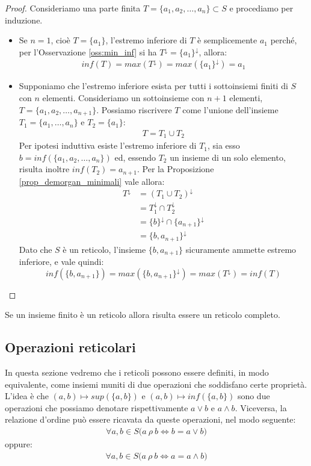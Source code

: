 \begin{proof}
	Consideriamo una parte finita $T =\{a_{1},a_{2},\ldots,a_{n}\} \subset S$ e procediamo per induzione.
	\begin{itemize}
		\item Se $n=1$, cioè $T=\{a_{1}\}$, l'estremo inferiore di $T$ è semplicemente $a_{1}$ perché, per l'Osservazione \ref{oss:min_inf} si ha $T^{\downarrow}=\{a_{1}\}^{\downarrow}$, allora:
		\begin{align*}
			 inf(T)=max(T^{\downarrow}) = max(\{a_{1}\}^{\downarrow})=a_{1}
		\end{align*}
		\item Supponiamo che l'estremo inferiore esista per tutti i sottoinsiemi finiti di $S$ con $n$ elementi. Consideriamo un sottoinsieme con $n+1$ elementi, $T=\{a_{1},a_{2},\ldots,a_{n+1}\}$. Possiamo riscrivere $T$ come l'unione dell'insieme $T_{1}=\{a_{1},\ldots,a_{n}\}$ e $T_{2}=\{a_{1}\}$:
		\begin{align*}
			T = T_{1} \cup T_{2}
		\end{align*}
		Per ipotesi induttiva esiste l'estremo inferiore di $T_{1}$, sia esso $b = inf(\{a_{1},a_{2},\ldots,a_{n}\})$ ed, essendo $T_{2}$ un insieme di un solo elemento, risulta inoltre $inf(T_{2}) = a_{n+1}$. Per la Proposizione \ref{prop_demorgan_minimali} vale allora:
		\begin{align*}
			T^{\downarrow} &= (T_{1} \cup T_{2})^{\downarrow} \\
			&=T_{1}^{\downarrow} \cap T_{2}^{\downarrow} \\
			&= \{b\}^{\downarrow} \cap \{a_{n+1}\}^{\downarrow} \\
			&= \{b,a_{n+1}\}^{\downarrow}
		\end{align*}
	Dato che $S$ è un reticolo, l'insieme $\{b,a_{n+1}\}$ sicuramente ammette estremo inferiore, e vale quindi:
	\begin{displaymath}
		inf(\{b,a_{n+1}\}) = max(\{b,a_{n+1}\}^{\downarrow}) = max(T^{\downarrow}) = inf(T)
	\end{displaymath}
	\end{itemize}
\end{proof}

Se un insieme finito è un reticolo allora risulta essere un reticolo completo.

\subsection{Operazioni reticolari}
In questa sezione vedremo che i reticoli possono essere definiti, in modo equivalente, come insiemi muniti di due operazioni che soddisfano certe proprietà. L'idea è che $(a,b) \mapsto sup(\{a,b\})$ e $(a,b) \mapsto inf(\{a,b\})$ sono due operazioni che possiamo denotare rispettivamente $a \vee b$ e $a \wedge b$. Viceversa, la relazione d'ordine può essere ricavata da queste operazioni, nel modo seguente:
\begin{align*}
	\forall a,b \in S \bigl(	a \ \rho \ b \iff b = a \vee b 	\bigr)
\end{align*}
oppure:
\begin{align*}
	\forall a,b \in S \bigl(	a \ \rho \ b \iff a = a \wedge b 	\bigr)
\end{align*}

